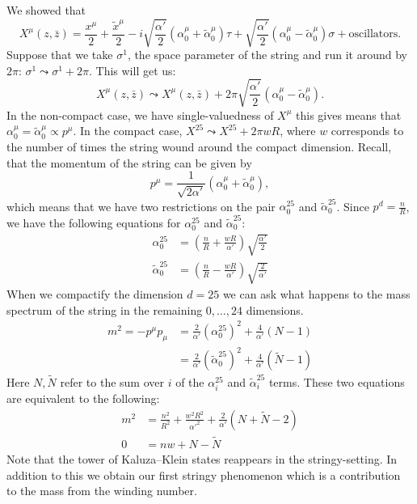 \documentclass{report}
\theoremstyle{plain}
\theoremstyle{definition}
\theoremstyle{remark}
\newcommand{\FR}[2]{\frac{#1}{#2}}
\newcommand{\SFR}[2]{\sqrt{\frac{#1}{#2}}}
\newcommand{\sg}{\sigma}
\begin{document}
We showed that \[X^\mu(z,\bar z) = \FR{x^\mu}{2} + \FR{\tilde x^\mu}{2}
-i\SFR{\alpha'}{2}(\alpha_0^\mu + \tilde \alpha_0^\mu)\tau
+ \SFR{\alpha'}{2}(\alpha_0^\mu - \tilde \alpha_0^\mu)\sg
+ \text{oscillators}.\]
Suppose that we take $\sg^1$, the space parameter of the string and run it
around by $2\pi$: $\sg^1 \leadsto \sg^1+2\pi$. This will get us:
\[X^\mu(z,\bar z) \leadsto X^\mu(z,\bar
z)+2\pi\SFR{\alpha'}{2}(\alpha_0^\mu - \tilde\alpha_0^\mu).\]
In the non-compact case, we have single-valuedness of $X^\mu$ this gives
means that $\alpha_0^\mu = \tilde\alpha_0^\mu\propto p^\mu$. In the compact
case, $X^{25} \leadsto X^{25} + 2\pi wR$, where $w$ corresponds to the number
of times the string wound around the compact dimension.  Recall, that the
momentum of the string can be given by \[p^\mu = \FR{1}{\sqrt{2\alpha'}}
(\alpha_0^\mu+\tilde\alpha_0^\mu),\] which means that we have two
restrictions on the pair $\alpha_0^{25}$ and $\tilde\alpha_0^{25}$. Since
$p^d = \FR{n}{R}$, we have the following equations for $\alpha_0^{25}$ and
$\tilde\alpha_0^{25}$:
\begin{align*}
    \alpha_0^{25} &= \left( \FR{n}{R}+\FR{wR}{\alpha'} \right)
    \SFR{\alpha'}{2}\\
    \tilde\alpha_0^{25}&= \left( \FR{n}{R}-\FR{wR}{\alpha'} \right)
    \SFR{2}{\alpha'}
\end{align*}
When we compactify the dimension $d=25$ we can ask what happens to the
mass spectrum of the string in the remaining $0,\dots,24$ dimensions.
\begin{align}
    m^2 = -p^\mu p_\mu 
&= \FR{2}{\alpha'}(\alpha_0^{25})^2 + \FR{4}{\alpha'}(N-1)\\
&= \FR{2}{\alpha'}(\tilde\alpha_0^{25})^2 + \FR{4}{\alpha'}(\tilde N-1)
\label{mass-spectrum-compactification}
\end{align}
Here $N,\tilde N$ refer to the sum over $i$ of the $\alpha_i^{25}$ and
$\tilde\alpha_i^{25}$ terms. These two equations are equivalent to the
following:
\begin{align}
    m^2 &= \FR{n^2}{R^2} + \FR{w^2R^2}{\alpha'^2} + \FR{2}{\alpha'}(N +
    \tilde N - 2)\\
    0&= nw + N-\tilde N
    \label{massspectrum-tduality}
\end{align}
Note that the tower of Kaluza--Klein states reappears in the
stringy-setting. In addition to this we obtain our first stringy phenomenon
which is a contribution to the mass from the winding number.
\end{document}
